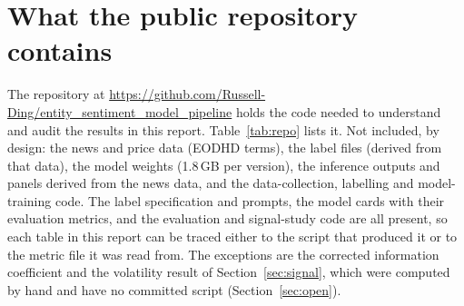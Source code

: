 \documentclass[11pt,letterpaper]{article}
\begin{document}
\clearpage
\section{What the public repository contains}
\label{app:repo}

The repository at \url{https://github.com/Russell-Ding/entity_sentiment_model_pipeline} holds the
code needed to understand and audit the results in this report. Table~\ref{tab:repo} lists it.
Not included, by design: the news and price data (EODHD terms), the label files (derived from
that data), the model weights (1.8\,GB per version), the inference outputs and panels derived from
the news data, and the data-collection, labelling and model-training code. The label
specification and prompts, the model cards with their evaluation metrics, and the evaluation and
signal-study code are all present, so each table in this report can be traced either to the
script that produced it or to the metric file it was read from. The exceptions are the corrected
information coefficient and the volatility result of Section~\ref{sec:signal}, which were
computed by hand and have no committed script (Section~\ref{sec:open}).
\end{document}
